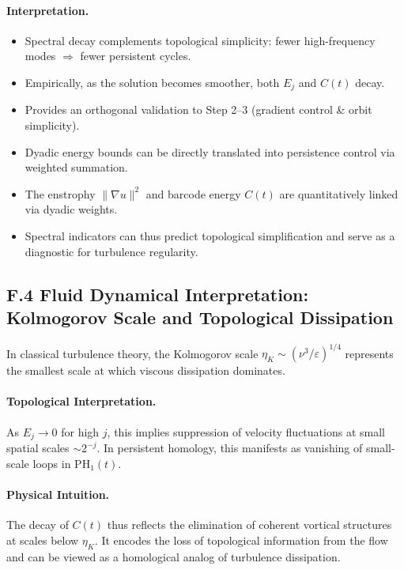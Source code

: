 \documentclass[11pt]{article}
\theoremstyle{definition}
\begin{document}
\paragraph{Interpretation.}
\begin{itemize}
  \item Spectral decay complements topological simplicity: fewer high-frequency modes \(\Rightarrow\) fewer persistent cycles.
  \item Empirically, as the solution becomes smoother, both \( E_j \) and \( C(t) \) decay.
  \item Provides an orthogonal validation to Step 2--3 (gradient control \& orbit simplicity).
  \item Dyadic energy bounds can be directly translated into persistence control via weighted summation.
  \item The enstrophy \( \|\nabla u\|^2 \) and barcode energy \( C(t) \) are quantitatively linked via dyadic weights.
  \item Spectral indicators can thus predict topological simplification and serve as a diagnostic for turbulence regularity.
\end{itemize}

\subsection*{F.4 Fluid Dynamical Interpretation: Kolmogorov Scale and Topological Dissipation}

In classical turbulence theory, the Kolmogorov scale \( \eta_K \sim (\nu^3 / \varepsilon)^{1/4} \) represents the smallest scale at which viscous dissipation dominates.

\paragraph{Topological Interpretation.} As \( E_j \to 0 \) for high \( j \), this implies suppression of velocity fluctuations at small spatial scales \( \sim 2^{-j} \). In persistent homology, this manifests as vanishing of small-scale loops in \( \mathrm{PH}_1(t) \).

\paragraph{Physical Intuition.} The decay of \( C(t) \) thus reflects the elimination of coherent vortical structures at scales below \( \eta_K \). It encodes the loss of topological information from the flow and can be viewed as a homological analog of turbulence dissipation.
\end{document}
